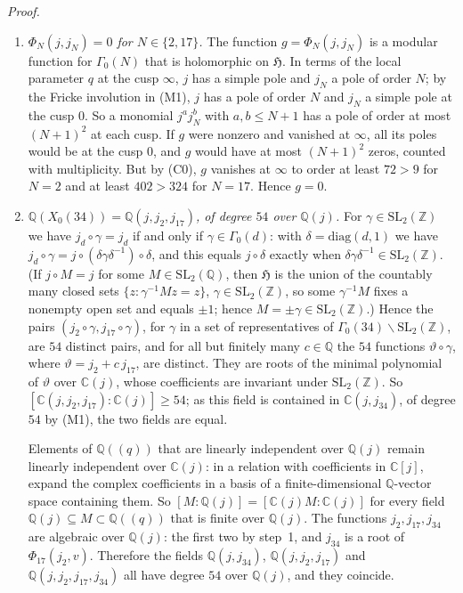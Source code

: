 \documentclass[11pt]{article}
\newcommand{\Q}{\mathbb Q}
\newcommand{\Z}{\mathbb Z}
\begin{document}
\emph{Proof.}
\begin{enumerate}
\item \emph{\(\Phi_N(j,j_N)=0\) for \(N\in\{2,17\}\).} The function \(g=\Phi_N(j,j_N)\) is a
modular function for \(\Gamma_0(N)\) that is holomorphic on \(\mathfrak H\). In terms of the
local parameter \(q\) at the cusp \(\infty\), \(j\) has a simple pole and \(j_N\) a pole of order
\(N\); by the Fricke involution in (M1), \(j\) has a pole of order \(N\) and \(j_N\) a simple pole at
the cusp \(0\). So a
monomial \(j^aj_N^b\) with \(a,b\le N+1\) has a pole of order at most \((N+1)^2\) at each cusp.
If \(g\) were nonzero and vanished at \(\infty\), all its poles would be at the cusp \(0\), and
\(g\) would have at most \((N+1)^2\) zeros, counted with multiplicity. But by (C0), \(g\)
vanishes at \(\infty\) to order at least \(72>9\) for \(N=2\) and at least \(402>324\) for
\(N=17\). Hence \(g=0\).

\item \emph{\(\Q(X_0(34))=\Q(j,j_2,j_{17})\), of degree \(54\) over \(\Q(j)\).} For
\(\gamma\in\mathrm{SL}_2(\Z)\) we have \(j_d\circ\gamma=j_d\) if and only if
\(\gamma\in\Gamma_0(d)\): with \(\delta=\mathrm{diag}(d,1)\) we have
\(j_d\circ\gamma=j\circ(\delta\gamma\delta^{-1})\circ\delta\), and this equals \(j\circ\delta\)
exactly when \(\delta\gamma\delta^{-1}\in\mathrm{SL}_2(\Z)\). (If \(j\circ M=j\) for some
\(M\in\mathrm{SL}_2(\Q)\), then \(\mathfrak H\) is the union of the countably many closed sets
\(\{z:\gamma^{-1}Mz=z\}\), \(\gamma\in\mathrm{SL}_2(\Z)\), so some \(\gamma^{-1}M\) fixes a
nonempty open set and equals \(\pm1\); hence \(M=\pm\gamma\in\mathrm{SL}_2(\Z)\).) Hence the pairs
\((j_2\circ\gamma,j_{17}\circ\gamma)\), for \(\gamma\) in a set of representatives of
\(\Gamma_0(34)\backslash\mathrm{SL}_2(\Z)\), are \(54\) distinct pairs, and for all but finitely
many \(c\in\Q\) the \(54\) functions \(\vartheta\circ\gamma\), where
\(\vartheta=j_2+c\,j_{17}\), are distinct. They are roots of the minimal polynomial of
\(\vartheta\) over \(\mathbb C(j)\), whose coefficients are invariant under
\(\mathrm{SL}_2(\Z)\). So \([\mathbb C(j,j_2,j_{17}):\mathbb C(j)]\ge54\); as this field is
contained in \(\mathbb C(j,j_{34})\), of degree \(54\) by (M1), the two fields are equal.

Elements of \(\Q((q))\) that are linearly independent over \(\Q(j)\) remain linearly
independent over \(\mathbb C(j)\): in a relation with coefficients in \(\mathbb C[j]\), expand
the complex coefficients in a basis of a finite-dimensional \(\Q\)-vector space containing
them. So \([M:\Q(j)]=[\mathbb C(j)M:\mathbb C(j)]\) for every field
\(\Q(j)\subseteq M\subset\Q((q))\) that is finite over \(\Q(j)\). The functions
\(j_2,j_{17},j_{34}\) are algebraic over \(\Q(j)\): the first two by step~1, and \(j_{34}\) is a
root of \(\Phi_{17}(j_2,v)\). Therefore the fields \(\Q(j,j_{34})\), \(\Q(j,j_2,j_{17})\) and
\(\Q(j,j_2,j_{17},j_{34})\) all have degree \(54\) over \(\Q(j)\), and they coincide.


\end{enumerate}
\end{document}
